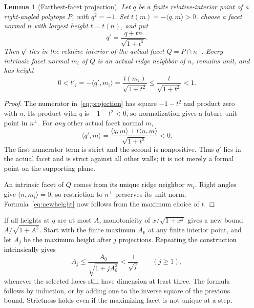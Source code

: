 \documentclass[11pt]{article}
\newtheorem{lemma}[theorem]{Lemma}
\theoremstyle{remark}
\newcommand{\ip}[2]{\langle #1,#2\rangle}
\begin{document}
\begin{lemma}[Farthest-facet projection]\label{lem:projection}
Let $q$ be a finite relative-interior point of a right-angled polytope
$P$, with $q^2=-1$. Set $t(m)=-\ip{q}{m}>0$, choose a facet normal
$n$ with largest height $t=t(n)$, and put
\begin{equation}\label{eq:projection}
 q'=\frac{q+tn}{\sqrt{1+t^2}}.
\end{equation}
Then $q'$ lies in the relative interior of the actual facet
$Q=P\cap n^\perp$. Every intrinsic facet normal $m_i$ of $Q$ is
an actual ridge neighbor of $n$, remains unit, and has height
\begin{equation}\label{eq:newheight}
 0<t'_i=-\ip{q'}{m_i}
       =\frac{t(m_i)}{\sqrt{1+t^2}}
       \le\frac{t}{\sqrt{1+t^2}}<1.
\end{equation}
\end{lemma}
\begin{proof}
The numerator in~\eqref{eq:projection} has square $-1-t^2$ and
product zero with $n$. Its product with $q$ is $-1-t^2<0$, so
normalization gives a future unit point in $n^\perp$. For \emph{any}
other actual facet normal $m$,
\begin{equation}\label{eq:allwall}
 \ip{q'}{m}=\frac{\ip{q}{m}+t\ip{n}{m}}{\sqrt{1+t^2}}<0.
\end{equation}
The first numerator term is strict and the second is nonpositive.
Thus $q'$ lies in the actual facet and is strict against all other
walls; it is not merely a formal point on the supporting plane.

An intrinsic facet of $Q$ comes from its unique ridge neighbor $m_i$.
Right angles give $\ip{n}{m_i}=0$, so restriction to $n^\perp$
preserves its unit norm. Formula~\eqref{eq:newheight} now follows
from the maximum choice of $t$.
\end{proof}

If all heights at $q$ are at most $A$, monotonicity of
$x/\sqrt{1+x^2}$ gives a new bound
$A/\sqrt{1+A^2}$. Start with the finite maximum $A_0$ at any finite
interior point, and let $A_j$ be the maximum height after $j$
projections. Repeating the construction intrinsically gives
\begin{equation}\label{eq:iterate}
 A_j\le\frac{A_0}{\sqrt{1+jA_0^2}}<\frac1{\sqrt j}
 \qquad(j\ge1),
\end{equation}
whenever the selected faces still have dimension at least three.
The formula follows by induction, or by adding one to the inverse
square of the previous bound. Strictness holds even if the maximizing
facet is not unique at a step.
\end{document}
